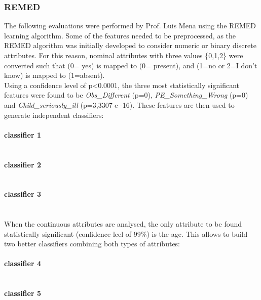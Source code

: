 \subsubsection{REMED}
The following evaluations were performed by Prof. Luis Mena using the REMED learning algorithm. Some of the features needed to be preprocessed, as the REMED algorithm was initially developed to consider numeric or binary discrete attributes. For this reason, nominal attributes with three values \{0,1,2\} were converted such that (0= yes) is mapped to (0= present), and (1=no or 2=I don't know) is mapped to (1=absent).\\
Using a confidence level of p\textless{0.0001}, the three most statistically significant features were found to be \textit{Obs\_Different} (p=0), \textit{PE\_Something\_Wrong} (p=0) and \textit{Child\_seriously\_ill} (p=3,3307 e -16). These features are then used to generate independent classifiers:
\\ \\ \textbf{classifier 1} \\{\small {}}
\\ \\ \textbf{classifier 2} \\{\small {}}
\\ \\ \textbf{classifier 3} \\{\small {}}
\\ \\ When the continuous attributes are analysed, the only attribute to be found statistically significant (confidence leel of 99\%) is the age. This allows to build two better classifiers combining both types of attributes:
\\ \\ \textbf{classifier 4} \\{\small {}}
\\ \\ \textbf{classifier 5} \\{\small {}}

